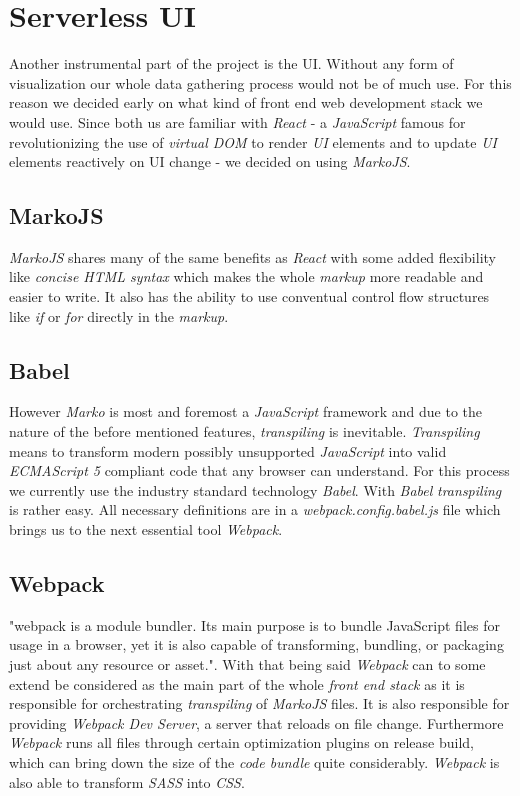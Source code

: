 \section{Serverless UI}

Another instrumental part of the project is the UI. Without any form of visualization our whole data
gathering process would not be of much use. For this reason we decided early on what kind of front
end web development stack we would use. Since both us are familiar with \textit{React} - a
\textit{JavaScript} famous for revolutionizing the use of \textit{virtual DOM}
to render \textit{UI} elements and to update \textit{UI} elements reactively on
UI change - we decided on using \textit{MarkoJS}.

\subsection{MarkoJS}

\textit{MarkoJS} shares many of the same benefits as \textit{React} with some added flexibility like
\textit{concise HTML syntax} which makes the whole \textit{markup} more readable and easier to
write. It also has the ability to use conventual control flow structures like \textit{if} or
\textit{for} directly in the \textit{markup}.

\subsection{Babel}

However \textit{Marko} is most and foremost a \textit{JavaScript} framework and due to the nature of
the before mentioned features, \textit{transpiling} is inevitable. \textit{Transpiling} means to
transform modern possibly unsupported \textit{JavaScript} into valid \textit{ECMAScript 5} compliant
code that any browser can understand. For this process we currently use the industry standard
technology \textit{Babel}. With \textit{Babel} \textit{transpiling} is rather easy. All necessary
definitions are in a \textit{webpack.config.babel.js} file which brings us to the next essential
tool \textit{Webpack}.

\subsection{Webpack}

"webpack is a module bundler. Its main purpose is to bundle JavaScript files for usage in a browser,
yet it is also capable of transforming, bundling, or packaging just about any resource or asset.".
With that being said \textit{Webpack} can to some extend be considered as the main part of the whole
\textit{front end stack} as it is responsible for orchestrating \textit{transpiling} of
\textit{MarkoJS} files. It is also responsible for providing \textit{Webpack Dev Server}, a server
that reloads on file change. Furthermore \textit{Webpack} runs all files through certain
optimization plugins on release build, which can bring down the size of the \textit{code bundle}
quite considerably. \textit{Webpack} is also able to transform \textit{SASS} into \textit{CSS}.

